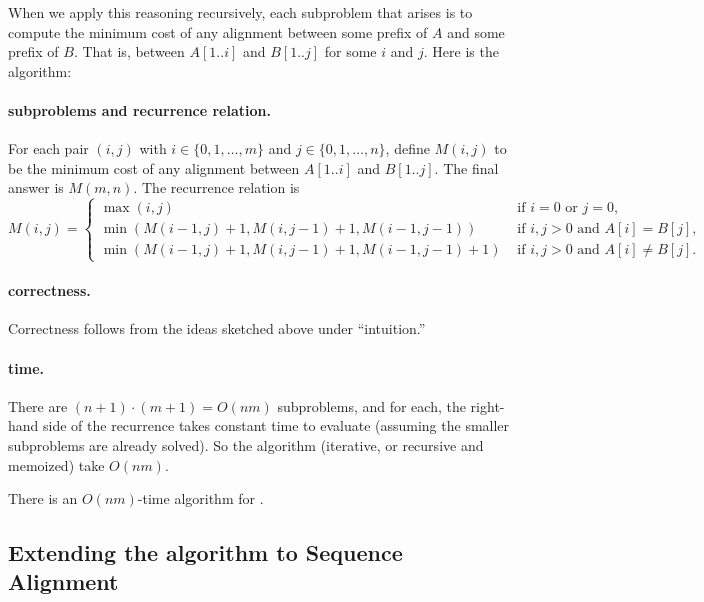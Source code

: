 When we apply this reasoning recursively,
each subproblem that arises is to compute
the minimum cost of any alignment between some prefix of $A$
and some prefix of $B$.
That is, between $A[1..i]$ and $B[1..j]$ for some $i$ and $j$.
Here is the algorithm:

\paragraph{subproblems and recurrence relation.}
For each pair $(i, j)$ with $i\in\{0,1,\ldots, m\}$ and $j\in\{0,1,\ldots,n\}$,
define $M(i, j)$ to be the minimum cost of any alignment between $A[1..i]$ and $B[1..j]$.
The final answer is $M(m, n)$.  The recurrence relation is
\[
  M(i, j) =
  \begin{cases}
    \max(i, j) & \text{ if } i=0 \text{ or } j=0, \\
    \min (M(i-1, j) + 1, M(i, j-1) + 1, M(i-1, j-1)) & \text{ if } i,j > 0 \text{ and } A[i] = B[j],  \\
    \min (M(i-1, j) + 1, M(i, j-1) + 1, M(i-1, j-1) + 1) & \text{ if } i,j > 0 \text{ and } A[i] \ne B[j]. 
  \end{cases}
\]

\paragraph{correctness.}
Correctness follows from the ideas sketched above under ``intuition.''

\paragraph{time.}
There are $(n+1)\cdot(m+1) = O(nm)$ subproblems,
and for each, the right-hand side of the recurrence takes
constant time to evaluate
(assuming the smaller subproblems are already solved).
So the algorithm (iterative, or recursive and memoized)
take $O(nm)$.

\begin{theorem}
  There is an $O(nm)$-time algorithm for .
\end{theorem}


\subsection*{Extending the algorithm to Sequence Alignment}

